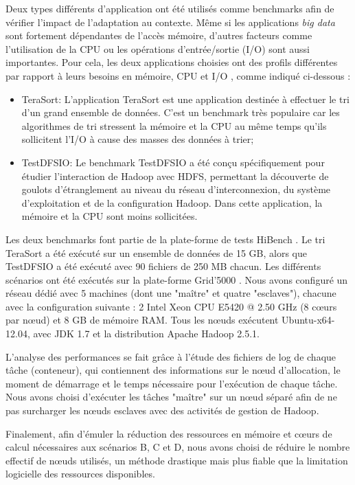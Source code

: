 Deux types différents d'application ont été utilisés comme benchmarks afin de vérifier l'impact de l'adaptation au contexte. Même si les applications \textit{big data} sont fortement dépendantes de l'accès mémoire, d'autres facteurs comme l'utilisation de la CPU ou les opérations d'entrée/sortie (I/O) sont aussi importantes. Pour cela, les deux applications choisies ont des profils différentes par rapport à leurs besoins en mémoire, CPU et  I/O \cite{Benchmarks}, comme indiqué ci-dessous :
\begin{itemize}
	\item TeraSort: L'application TeraSort \cite{TeraSort2008} est une application destinée à effectuer le tri d'un grand ensemble de données. C'est un benchmark très populaire car les algorithmes de tri stressent la mémoire et la CPU au même temps qu'ils sollicitent l'I/O à cause des masses des données à trier;
	\item TestDFSIO: Le benchmark TestDFSIO a été conçu spécifiquement pour étudier l'interaction de Hadoop avec HDFS, permettant la découverte de goulots d'étranglement au niveau du réseau d'interconnexion, du système d'exploitation et de la configuration Hadoop. Dans cette application, la mémoire et la CPU sont moins sollicitées.
\end{itemize}

Les deux benchmarks font partie de la plate-forme de tests HiBench \cite{HiBench}. Le tri TeraSort a été exécuté sur un ensemble de données de 15 GB, alors que TestDFSIO a été exécuté avec 90 fichiers de 250 MB chacun. Les différents scénarios ont été exécutés sur la plate-forme Grid'5000 \cite{g5k}. Nous avons configuré un réseau dédié avec 5 machines (dont une "maître" et quatre "esclaves"), chacune avec la configuration suivante : 2 Intel Xeon CPU E5420 @ 2.50 GHz (8 c{\oe}urs par n{\oe}ud) et 8 GB de mémoire RAM. Tous les n{\oe}uds exécutent Ubuntu-x64-12.04, avec JDK 1.7 et la distribution Apache Hadoop 2.5.1. 

L'analyse des performances se fait grâce à l'étude des fichiers de log de chaque tâche (conteneur), qui contiennent des informations sur le n{\oe}ud d'allocation, le moment de démarrage et le temps nécessaire pour l'exécution de chaque tâche. Nous avons choisi d'exécuter les tâches "maître" sur un n{\oe}ud séparé afin de ne pas surcharger les n{\oe}uds esclaves avec des activités de gestion de Hadoop. 

Finalement, afin d'émuler la réduction des ressources en mémoire et c{\oe}urs de calcul nécessaires aux scénarios B, C et D, nous avons choisi de réduire le nombre effectif de n{\oe}uds utilisés, un méthode drastique mais plus fiable que la limitation logicielle des ressources disponibles.

